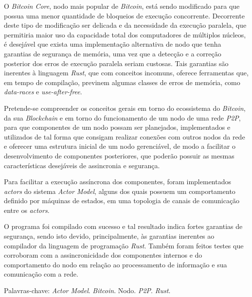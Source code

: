 \begin{resumo}
O \textit{Bitcoin Core}, nodo mais popular de \textit{Bitcoin}, está sendo modificado para que possua uma menor quantidade de bloqueios de execução concorrente. Decorrente deste tipo de modificação ser delicada e da necessidade da execução paralela, que permitiria maior uso da capacidade total dos computadores de múltiplos núcleos, é desejável que exista uma implementação alternativa de nodo que tenha garantias de segurança de memória, uma vez que a detecção e a correção posterior dos erros de execução paralela seriam custosas. Tais garantias são inerentes à linguagem \textit{Rust}, que com conceitos incomuns, oferece ferramentas que, em tempo de compilação, previnem algumas classes de erros de memória, como \textit{data-races} e \textit{use-after-free}.

Pretende-se compreender os conceitos gerais em torno do ecossistema do \textit{Bitcoin}, da sua \textit{Blockchain} e em torno do funcionamento de um nodo de uma rede \textit{P2P}, para que componentes de um nodo possam ser planejados, implementados e utilizados de tal forma que consigam realizar conexões com outros nodos da rede e oferecer uma estrutura inicial de um nodo gerenciável, de modo a facilitar o desenvolvimento de componentes posteriores, que poderão possuir as mesmas características desejáveis de assincronia e segurança.

Para facilitar a execução assíncrona dos componentes, foram implementados \textit{actors} do sistema \textit{Actor Model}, alguns dos quais possuem um comportamento definido por máquinas de estados, em uma topologia de canais de comunicação entre os \textit{actors}.

O programa foi compilado com sucesso e tal resultado indica fortes garantias de segurança, sendo isto devido, principalmente, às garantias inerentes ao compilador da linguagem de programação \textit{Rust}. Também foram feitos testes que corroboram com a assincronicidade dos componentes internos e do comportamento do nodo em relação ao processamento de informação e sua comunicação com a rede.

Palavras-chave: \textit{Actor Model}. \textit{Bitcoin}. Nodo. \textit{P2P}. \textit{Rust}.
\end{resumo}

